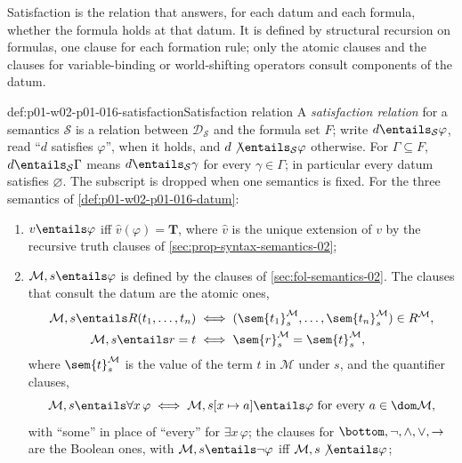 Satisfaction is the relation that answers, for each datum and each formula,
whether the formula holds at that datum. It is defined by structural
recursion on formulas, one clause for each formation rule; only the atomic
clauses and the clauses for variable-binding or world-shifting operators
consult components of the datum.

\begin{hbdefinition}{def:p01-w02-p01-016-satisfaction}{Satisfaction relation}
A \emph{satisfaction relation} for a semantics \(\mathcal S\) is a relation
between \(\mathcal D_{\mathcal S}\) and the formula set \(F\); write
\(d\entails_{\mathcal S}\varphi\), read ``\(d\) satisfies \(\varphi\)'', when
it holds, and \(d\not\entails_{\mathcal S}\varphi\) otherwise. For
\(\Gamma\subseteq F\), \(d\entails_{\mathcal S}\Gamma\) means
\(d\entails_{\mathcal S}\gamma\) for every \(\gamma\in\Gamma\); in particular
every datum satisfies \(\varnothing\). The subscript is dropped when one
semantics is fixed. For the three semantics of
\cref{def:p01-w02-p01-016-datum}:
\begin{enumerate}
  \item \(v\entails\varphi\) iff \(\widehat v(\varphi)=\mathbf T\), where
        \(\widehat v\) is the unique extension of \(v\) by the recursive
        truth clauses of \cref{sec:prop-syntax-semantics-02};
  \item \(\mathcal M,s\entails\varphi\) is defined by the clauses of
        \cref{sec:fol-semantics-02}. The clauses that consult the datum are
        the atomic ones,
        \[
          \begin{aligned}
          \mathcal M,s\entails R(t_1,\ldots,t_n)
          &\iff
          (\sem{t_1}^{\mathcal M}_s,\ldots,\sem{t_n}^{\mathcal M}_s)\in
          R^{\mathcal M},\\
          \mathcal M,s\entails r=t
          &\iff
          \sem{r}^{\mathcal M}_s=\sem{t}^{\mathcal M}_s,
          \end{aligned}
        \]
        where \(\sem{t}^{\mathcal M}_s\) is the value of the term \(t\) in
        \(\mathcal M\) under \(s\), and the quantifier clauses,
        \[
          \mathcal M,s\entails\forall x\,\varphi
          \iff
          \mathcal M,s[x\mapsto a]\entails\varphi
          \text{ for every }a\in\dom\mathcal M,
        \]
        with ``some'' in place of ``every'' for \(\exists x\,\varphi\); the
        clauses for \(\bottom,\neg,\land,\lor,\to\) are the Boolean ones,
        with \(\mathcal M,s\entails\neg\varphi\) iff
        \(\mathcal M,s\not\entails\varphi\);

\end{enumerate}
\end{hbdefinition}

